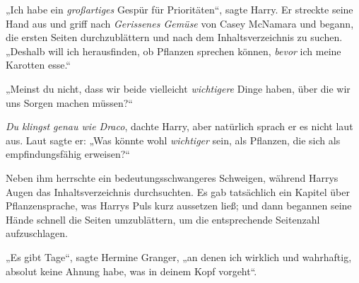 „Ich habe ein \emph{großartiges} Gespür für Prioritäten“, sagte Harry. Er streckte seine Hand aus und griff nach \emph{Gerissenes Gemüse} von Casey McNamara und begann, die ersten Seiten durchzublättern und nach dem Inhaltsverzeichnis zu suchen. „Deshalb will ich herausfinden, ob Pflanzen sprechen können, \emph{bevor} ich meine Karotten esse.“

„Meinst du nicht, dass wir beide vielleicht \emph{wichtigere} Dinge haben, über die wir uns Sorgen machen müssen?“

\emph{Du klingst genau wie Draco}, dachte Harry, aber natürlich sprach er es nicht laut aus. Laut sagte er: „Was könnte wohl \emph{wichtiger} sein, als Pflanzen, die sich als empfindungsfähig erweisen?“

Neben ihm herrschte ein bedeutungsschwangeres Schweigen, während Harrys Augen das Inhaltsverzeichnis durchsuchten. Es gab tatsächlich ein Kapitel über Pflanzensprache, was Harrys Puls kurz aussetzen ließ; und dann begannen seine Hände schnell die Seiten umzublättern, um die entsprechende Seitenzahl aufzuschlagen.

„Es gibt Tage“, sagte Hermine Granger, „an denen ich wirklich und wahrhaftig, absolut keine Ahnung habe, was in deinem Kopf vorgeht“.

